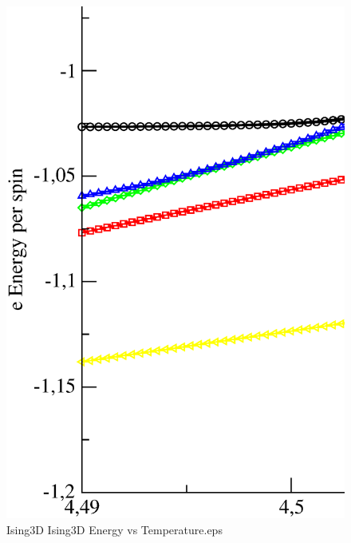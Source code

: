 \begin{figure}[!htpb]
  \centering
  \includegraphics[width=\textwidth]{./plots/Ising3D/Ising3D_Energy_vs_Temperature.eps}
  \caption{Ising3D Ising3D Energy vs Temperature.eps}
\end{figure}

